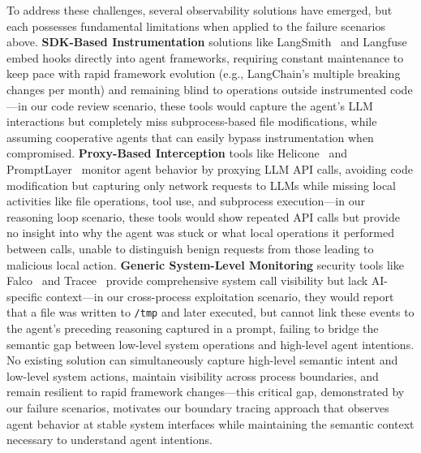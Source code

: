 To address these challenges, several observability solutions have emerged, but each possesses fundamental limitations when applied to the failure scenarios above. \textbf{SDK-Based Instrumentation} solutions like LangSmith~\cite{langsmith} and Langfuse~\cite{langfuse} embed hooks directly into agent frameworks, requiring constant maintenance to keep pace with rapid framework evolution (e.g., LangChain's multiple breaking changes per month) and remaining blind to operations outside instrumented code—in our code review scenario, these tools would capture the agent's LLM interactions but completely miss subprocess-based file modifications, while assuming cooperative agents that can easily bypass instrumentation when compromised. \textbf{Proxy-Based Interception} tools like Helicone~\cite{helicone} and PromptLayer~\cite{promptlayer} monitor agent behavior by proxying LLM API calls, avoiding code modification but capturing only network requests to LLMs while missing local activities like file operations, tool use, and subprocess execution—in our reasoning loop scenario, these tools would show repeated API calls but provide no insight into why the agent was stuck or what local operations it performed between calls, unable to distinguish benign requests from those leading to malicious local action. \textbf{Generic System-Level Monitoring} security tools like Falco~\cite{falco} and Tracee~\cite{tracee} provide comprehensive system call visibility but lack AI-specific context—in our cross-process exploitation scenario, they would report that a file was written to \texttt{/tmp} and later executed, but cannot link these events to the agent's preceding reasoning captured in a prompt, failing to bridge the semantic gap between low-level system operations and high-level agent intentions. No existing solution can simultaneously capture high-level semantic intent and low-level system actions, maintain visibility across process boundaries, and remain resilient to rapid framework changes—this critical gap, demonstrated by our failure scenarios, motivates our boundary tracing approach that observes agent behavior at stable system interfaces while maintaining the semantic context necessary to understand agent intentions.
